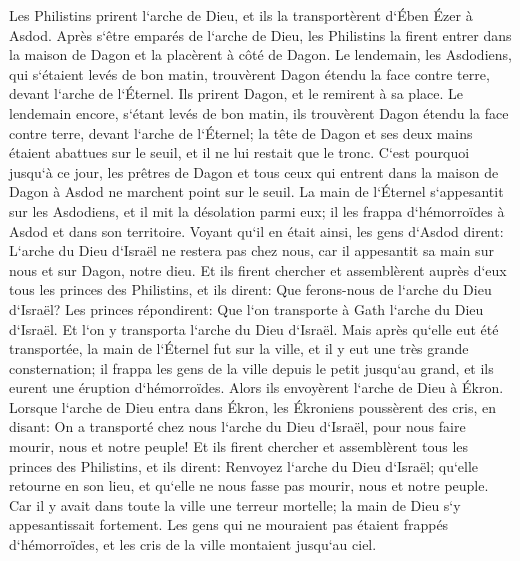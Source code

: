 \verse Les Philistins prirent l`arche de Dieu, et ils la transportèrent d`Ében Ézer à Asdod. 
\verse Après s`être emparés de l`arche de Dieu, les Philistins la firent entrer dans la maison de Dagon et la placèrent à côté de Dagon. 
\verse Le lendemain, les Asdodiens, qui s`étaient levés de bon matin, trouvèrent Dagon étendu la face contre terre, devant l`arche de l`Éternel. Ils prirent Dagon, et le remirent à sa place. 
\verse Le lendemain encore, s`étant levés de bon matin, ils trouvèrent Dagon étendu la face contre terre, devant l`arche de l`Éternel; la tête de Dagon et ses deux mains étaient abattues sur le seuil, et il ne lui restait que le tronc. 
\verse C`est pourquoi jusqu`à ce jour, les prêtres de Dagon et tous ceux qui entrent dans la maison de Dagon à Asdod ne marchent point sur le seuil. 
\verse La main de l`Éternel s`appesantit sur les Asdodiens, et il mit la désolation parmi eux; il les frappa d`hémorroïdes à Asdod et dans son territoire. 
\verse Voyant qu`il en était ainsi, les gens d`Asdod dirent: L`arche du Dieu d`Israël ne restera pas chez nous, car il appesantit sa main sur nous et sur Dagon, notre dieu. 
\verse Et ils firent chercher et assemblèrent auprès d`eux tous les princes des Philistins, et ils dirent: Que ferons-nous de l`arche du Dieu d`Israël? Les princes répondirent: Que l`on transporte à Gath l`arche du Dieu d`Israël. Et l`on y transporta l`arche du Dieu d`Israël. 
\verse Mais après qu`elle eut été transportée, la main de l`Éternel fut sur la ville, et il y eut une très grande consternation; il frappa les gens de la ville depuis le petit jusqu`au grand, et ils eurent une éruption d`hémorroïdes. 
\verse Alors ils envoyèrent l`arche de Dieu à Ékron. Lorsque l`arche de Dieu entra dans Ékron, les Ékroniens poussèrent des cris, en disant: On a transporté chez nous l`arche du Dieu d`Israël, pour nous faire mourir, nous et notre peuple! 
\verse Et ils firent chercher et assemblèrent tous les princes des Philistins, et ils dirent: Renvoyez l`arche du Dieu d`Israël; qu`elle retourne en son lieu, et qu`elle ne nous fasse pas mourir, nous et notre peuple. Car il y avait dans toute la ville une terreur mortelle; la main de Dieu s`y appesantissait fortement. 
\verse Les gens qui ne mouraient pas étaient frappés d`hémorroïdes, et les cris de la ville montaient jusqu`au ciel. 

\chapter{}

